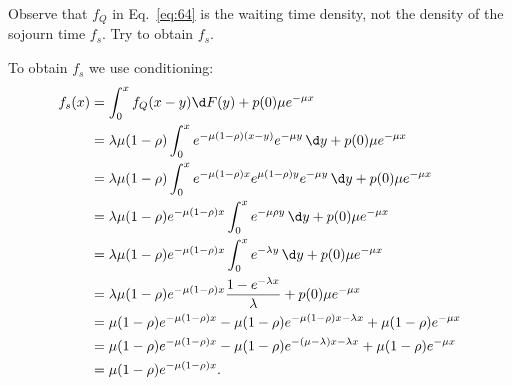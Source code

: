 \begin{exercise}
 Observe that $f_Q$ in Eq.~\cref{eq:64} is the waiting time density, not the
 density of the sojourn time $f_s$. Try to obtain $f_s$.
\begin{solution}
 To obtain $f_s$ we use conditioning:
\begin{align*}
f_s(x)
&= \int_0^x f_Q(x-y) \d F(y) + p(0) \mu e^{-\mu x} \\
&= \lambda \mu (1-\rho) \int_0^x e^{- \mu(1-\rho)(x-y)} e^{-\mu y} \,\d y + p(0) \mu e^{-\mu x} \\
&= \lambda \mu (1-\rho) \int_0^x e^{- \mu(1-\rho)x} e^{\mu(1-\rho)y} e^{-\mu y} \,\d y + p(0) \mu e^{-\mu x} \\
&= \lambda \mu (1-\rho) e^{- \mu(1-\rho)x} \int_0^x e^{- \mu \rho y} \, \d y + p(0) \mu e^{-\mu x} \\
&= \lambda \mu (1-\rho) e^{- \mu(1-\rho)x} \int_0^x e^{- \lambda y} \,\d y + p(0) \mu e^{-\mu x} \\
&= \lambda \mu (1-\rho) e^{- \mu(1-\rho)x} \frac{1 - e^{- \lambda x}}{\lambda} + p(0) \mu e^{-\mu x} \\
&= \mu (1-\rho) e^{- \mu(1-\rho)x} - \mu (1-\rho) e^{- \mu(1-\rho)x - \lambda x} + \mu (1-\rho) e^{-\mu x} \\
&= \mu (1-\rho) e^{- \mu(1-\rho)x} - \mu (1-\rho) e^{- (\mu - \lambda) x - \lambda x} + \mu (1-\rho) e^{-\mu x} \\
&= \mu (1-\rho) e^{- \mu(1-\rho)x}.
\end{align*}
\end{solution}
\end{exercise}
